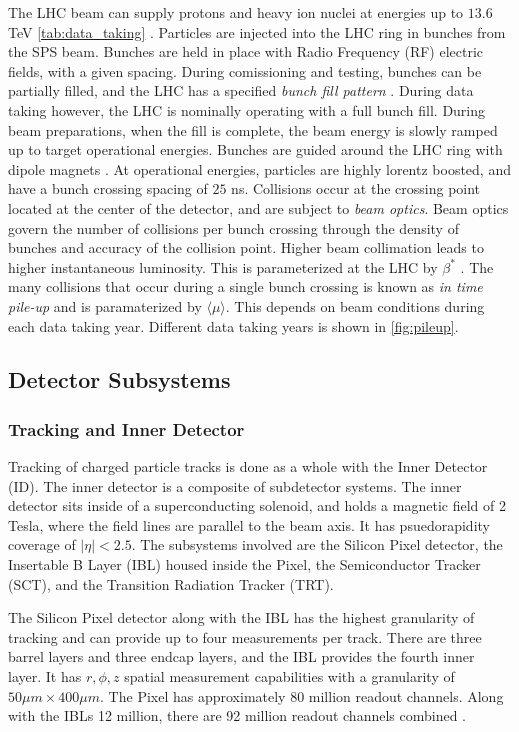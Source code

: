 \documentclass[12pt]{article}
\begin{document}
The LHC beam can supply protons and heavy ion nuclei at energies up to $13.6$
TeV \ref{tab:data_taking} \cite{Aad_2024}. Particles are injected into the LHC
ring in bunches from the SPS beam. Bunches are held in place with Radio
Frequency (RF) electric fields, with a given spacing. During comissioning and
testing, bunches can be partially filled, and the LHC has a specified
\textit{bunch fill pattern} \cite{}. During data taking however, the LHC is nominally
operating with a full bunch fill. During beam preparations, when the fill is
complete, the beam energy is slowly ramped up to target operational energies.
Bunches are guided around the LHC ring with dipole magnets \cite{}. At
operational energies, particles are highly lorentz boosted, and have a bunch
crossing spacing of $25$ ns. Collisions occur at the crossing point located at
the center of the detector, and are subject to \textit{beam optics}. Beam optics
govern the number of collisions per bunch crossing through the density of
bunches and accuracy of the collision point. Higher beam collimation leads to
higher instantaneous luminosity. This is parameterized at the LHC by $\beta^*$
\cite{Aad_2024}. The many collisions that occur during a single bunch crossing
is known as \textit{in time pile-up} and is paramaterized by
$\langle\mu\rangle$. This depends on beam conditions during each data taking
year. Different data taking years is shown in \ref{fig:pileup}. 

\subsection{Detector Subsystems} \label{sec:detector_subsystems}
\subsubsection{Tracking and Inner Detector}
Tracking of charged particle tracks is done as a whole with the Inner Detector
(ID). The inner detector is a composite of subdetector systems. The inner
detector sits inside of a superconducting solenoid, and holds a magnetic field
of 2 Tesla, where the field lines are parallel to the beam axis. It has
psuedorapidity coverage of $|\eta| < 2.5$. The subsystems involved are the
Silicon Pixel detector, the Insertable B Layer (IBL) housed inside the Pixel,
the Semiconductor Tracker (SCT), and the Transition Radiation Tracker (TRT).

The Silicon Pixel detector along with the IBL has the highest granularity of
tracking and can provide up to four measurements per track. There are three
barrel layers and three endcap layers, and the IBL provides the fourth inner
layer. It has $r, \phi, z$ spatial measurement capabilities with a granularity
of $50 \mu m \times 400 \mu m$. The Pixel has approximately 80 million readout
channels. Along with the IBLs 12 million, there are 92 million readout channels
combined \cite{Aad_2024}.
\end{document}
